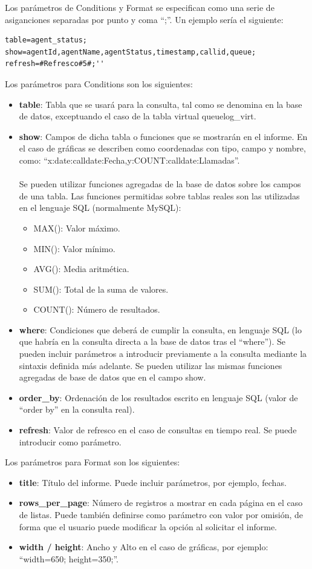 \documentclass[spanish,12pt]{book}
\begin{document}
Los parámetros de Conditions y Format se especifican como una serie de asiganciones separadas por punto y coma ``;''. Un ejemplo sería el siguiente:
\begin{lstlisting}
table=agent_status;
show=agentId,agentName,agentStatus,timestamp,callid,queue;
refresh=#Refresco#5#;''
\end{lstlisting}

Los parámetros para Conditions son los siguientes:
\begin{itemize}
\item {\bf table}: Tabla que se usará para la consulta, tal como se denomina en la base de datos, exceptuando el caso de la tabla virtual queuelog\_virt.
\item {\bf show}: Campos de dicha tabla o funciones que se mostrarán en el informe. En el caso de gráficas se describen como coordenadas con tipo, campo y nombre, como: ``x:date:calldate:Fecha,y:COUNT:calldate:Llamadas''.\\\\Se pueden utilizar funciones agregadas de la base de datos sobre los campos de una tabla. Las funciones permitidas sobre tablas reales son las utilizadas en el lenguaje SQL (normalmente MySQL):
	\begin{itemize}
	\item MAX(): Valor máximo.
	\item MIN(): Valor mínimo.
	\item AVG(): Media aritmética.
	\item SUM(): Total de la suma de valores.
	\item COUNT(): Número de resultados.
	\end{itemize}
\item {\bf where}: Condiciones que deberá de cumplir la consulta, en lenguaje SQL (lo que habría en la consulta directa a la base de datos tras el ``where''). Se pueden incluir parámetros a introducir previamente a la consulta mediante la sintaxis definida más adelante. Se pueden utilizar las mismas funciones agregadas de base de datos que en el campo show.
\item {\bf order\_by}: Ordenación de los resultados escrito en lenguaje SQL (valor de ``order by'' en la consulta real).
\item {\bf refresh}: Valor de refresco en el caso de consultas en tiempo real. Se puede introducir como parámetro.
\end{itemize}

Los parámetros para Format son los siguientes:
\begin{itemize}
\item {\bf title}: Título del informe. Puede incluir parámetros, por ejemplo, fechas.
\item {\bf rows\_per\_page}: Número de registros a mostrar en cada página en el caso de listas. Puede también definirse como parámetro con valor por omisión, de forma que el usuario puede modificar la opción al solicitar el informe.
\item {\bf width / height}: Ancho y Alto en el caso de gráficas, por ejemplo: ``width=650; height=350;''.
\end{itemize}
\end{document}
